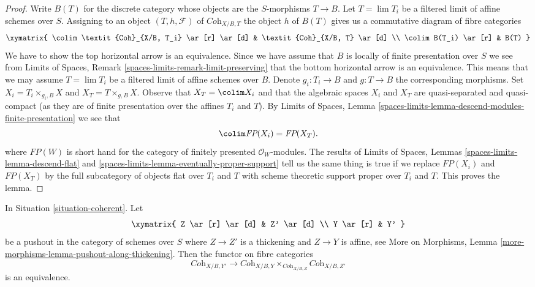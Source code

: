 \begin{proof}
Write $B(T)$ for the discrete category whose
objects are the $S$-morphisms $T \to B$. Let $T = \lim T_i$ be a filtered
limit of affine schemes over $S$. Assigning to an object
$(T, h, \mathcal{F})$ of $\textit{Coh}_{X/B, T}$ the object $h$
of $B(T)$ gives us a commutative diagram of fibre categories
$$
\xymatrix{
\colim \textit{Coh}_{X/B, T_i} \ar[r] \ar[d] &
\textit{Coh}_{X/B, T} \ar[d] \\
\colim B(T_i) \ar[r] & B(T)
}
$$
We have to show the top horizontal arrow is an equivalence. Since
we have assume that $B$ is locally of finite presentation over $S$
we see from
Limits of Spaces, Remark \ref{spaces-limits-remark-limit-preserving}
that the bottom horizontal arrow is an equivalence. This means that
we may assume $T = \lim T_i$ be a filtered limit of affine schemes over
$B$. Denote $g_i : T_i \to B$ and $g : T \to B$ the corresponding
morphisms. Set $X_i = T_i \times_{g_i, B} X$ and $X_T = T \times_{g, B} X$.
Observe that $X_T = \colim X_i$ and that the algebraic spaces
$X_i$ and $X_T$ are quasi-separated and quasi-compact (as they
are of finite presentation over the affines $T_i$ and $T$).
By Limits of Spaces, Lemma
\ref{spaces-limits-lemma-descend-modules-finite-presentation}
we see that
$$
\colim \textit{FP}(X_i) = \textit{FP}(X_T).
$$
where $\textit{FP}(W)$ is short hand for the category of finitely
presented $\mathcal{O}_W$-modules. The results of
Limits of Spaces, Lemmas \ref{spaces-limits-lemma-descend-flat} and
\ref{spaces-limits-lemma-eventually-proper-support}
tell us the same thing is true if we replace $\textit{FP}(X_i)$
and $\textit{FP}(X_T)$ by the full subcategory of objects
flat over $T_i$ and $T$ with scheme theoretic support proper
over $T_i$ and $T$. This proves the lemma.
\end{proof}

\begin{lemma}
\label{lemma-coherent-RS-star}
In Situation \ref{situation-coherent}. Let
$$
\xymatrix{
Z \ar[r] \ar[d] & Z' \ar[d] \\
Y \ar[r] & Y'
}
$$
be a pushout in the category of schemes over $S$ where
$Z \to Z'$ is a thickening and $Z \to Y$ is affine, see
More on Morphisms, Lemma \ref{more-morphisms-lemma-pushout-along-thickening}.
Then the functor on fibre categories
$$
\textit{Coh}_{X/B, Y'}
\longrightarrow
\textit{Coh}_{X/B, Y} \times_{\textit{Coh}_{X/B, Z}} \textit{Coh}_{X/B, Z'}
$$
is an equivalence.
\end{lemma}


